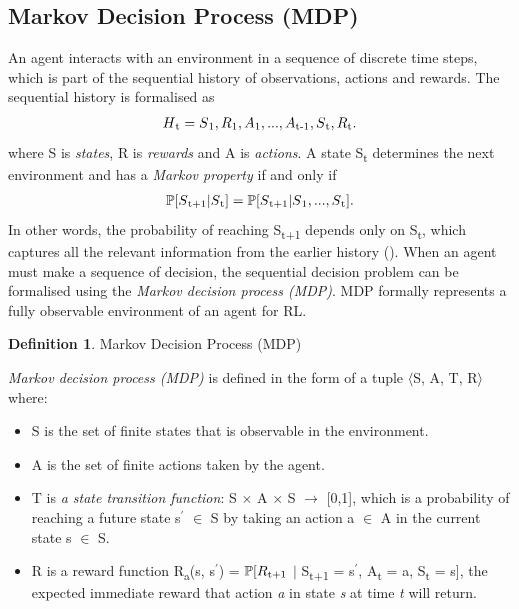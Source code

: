 \documentclass[11pt,twoside]{report}
\theoremstyle{plain}
\theoremstyle{definition}
\newtheorem{defn}[thm]{Definition} %
\begin{document}
\subsection{Markov Decision Process (MDP)}
\label{mdp_subsection}
An agent interacts with an environment in a sequence of discrete time steps, which is part of the sequential history of observations, actions and rewards. The sequential history is formalised as 
\begin{equation}
\begin{split}
H\textsubscript{t} = S\textsubscript{1}, R\textsubscript{1}, A\textsubscript{1}, ..., A\textsubscript{t-1}, S\textsubscript{t}, R\textsubscript{t}.  
\end{split}
\end{equation}
where S is \textit{states}, R is \textit{rewards} and A is \textit{actions}. A state S\textsubscript{t} determines the next environment and has a \textit{Markov property} if and only if 
\begin{equation}
\begin{split}
\mathbb{P}[S\textsubscript{t+1} \vert S\textsubscript{t}] = \mathbb{P}[S\textsubscript{t+1} \vert S\textsubscript{1}, ..., S\textsubscript{t}].
\end{split}
\end{equation}
In other words, the probability of reaching S\textsubscript{t+1} depends only on S\textsubscript{t}, which captures all the relevant information from the earlier history (\cite{Puterman1994}).
When an agent must make a sequence of decision, the sequential decision problem can be formalised using the \textit{Markov decision process (MDP)}. MDP formally represents a fully observable environment of an agent for 
RL.
\begin{defn}{Markov Decision Process (MDP)}

\textit{Markov decision process (MDP)} is defined in the form of a tuple $\langle$S, A, T, R$\rangle$ where:
\begin{itemize}
\item S is the set of finite states that is observable in the environment.
\item A is the set of finite actions taken by the agent.
\item T is \textit{a state transition function}: S $\times$ A $\times$ S $\rightarrow$ [0,1], which is a probability of reaching a future state s$^\prime$ $\in$ S by taking an action a $\in$ A in the current state  s $\in$ S.
\item R is a reward function R\textsubscript{a}(s, s$^\prime$) = $\mathbb{P}[R\textsubscript{t+1} $ $\vert$ S\textsubscript{t+1} = s$^\prime$, A\textsubscript{t} = a, S\textsubscript{t} = s], the expected immediate reward that action \textit{a} in state \textit{s} at time \textit{t} will return.
\end{itemize}
\end{defn}
\end{document}
